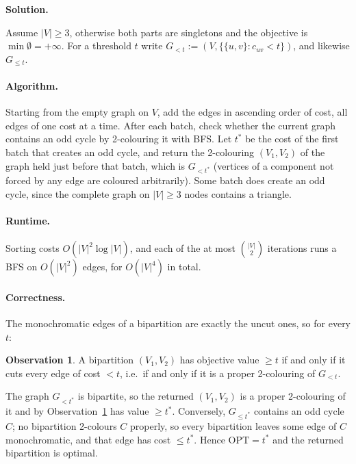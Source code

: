\documentclass[11pt,letterpaper]{article}
\theoremstyle{definition}
\newtheorem{observation}[theorem]{Observation}
\newcommand{\OPT}{\mathrm{OPT}}
\newcommand{\solution}{\medskip\noindent\textbf{Solution.}\par\medskip}
\begin{document}
\solution

Assume $|V|\geq 3$, otherwise both parts are singletons and the objective is $\min\emptyset=+\infty$.
For a threshold $t$ write $G_{<t}:=(V,\{\{u,v\}: c_{uv}<t\})$, and likewise $G_{\leq t}$.

\paragraph{Algorithm.}
Starting from the empty graph on $V$, add the edges in ascending order of cost, all edges of one cost at a time.
After each batch, check whether the current graph contains an odd cycle by 2-colouring it with BFS.
Let $t^*$ be the cost of the first batch that creates an odd cycle, and return the 2-colouring $(V_1,V_2)$ of the graph held just before that batch, which is $G_{<t^*}$ (vertices of a component not forced by any edge are coloured arbitrarily).
Some batch does create an odd cycle, since the complete graph on $|V|\geq3$ nodes contains a triangle.

\paragraph{Runtime.}
Sorting costs $O(|V|^2\log|V|)$, and each of the at most $\binom{|V|}{2}$ iterations runs a BFS on $O(|V|^2)$ edges, for $O(|V|^4)$ in total.

\paragraph{Correctness.}
The monochromatic edges of a bipartition are exactly the uncut ones, so for every $t$:
\begin{observation}\label{obs:q10}
    A bipartition $(V_1,V_2)$ has objective value $\geq t$ if and only if it cuts every edge of cost $<t$, i.e.\ if and only if it is a proper 2-colouring of $G_{<t}$.
\end{observation}
\noindent
The graph $G_{<t^*}$ is bipartite, so the returned $(V_1,V_2)$ is a proper 2-colouring of it and by Observation~\ref{obs:q10} has value $\geq t^*$.
Conversely, $G_{\leq t^*}$ contains an odd cycle $C$; no bipartition 2-colours $C$ properly, so every bipartition leaves some edge of $C$ monochromatic, and that edge has cost $\leq t^*$.
Hence $\OPT=t^*$ and the returned bipartition is optimal.
\end{document}
